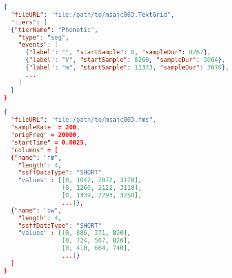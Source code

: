 \documentclass[A4,12pt, utf8]{article}
\begin{document}
\begin{lstlisting}[caption=internal label representation, label=ilr, language=json,firstnumber=1]
{
  "fileURL": "file:/path/to/msajc003.TextGrid",
  "tiers": [
  {"tierName": "Phonetic",
    "type": "seg",
    "events": [
      {"label": "", "startSample": 0, "sampleDur": 8267}, 
      {"label": "V", "startSample": 8268, "sampleDur": 3064}, 
      {"label": "m", "startSample": 11333, "sampleDur": 3670}, 
      ...
    ]
  }
}
\end{lstlisting}

\begin{lstlisting}[caption=internal derived signal representation,label=idsr, language=json,firstnumber=1]
{
  "fileURL": "file:/path/to/msajc003.fms",
  "sampleRate" = 200,
  "origFreq" = 20000,
  "startTime" = 0.0025,
  "columns" = [
  {"name": "fm",
    "length": 4,
    "ssffDataType": "SHORT"
    "values" : [[0, 1042, 2072, 3170],
                [0, 1260, 2122, 3118],
                [0, 1339, 2293, 3258],
                ...]},
  {"name": "bw",
    "length": 4,
    "ssffDataType": "SHORT"
    "values" : [[0, 886, 371, 890],
                [0, 724, 567, 826],
                [0, 410, 664, 740],
                ...]}
  ]
}
\end{lstlisting}







\end{document}
